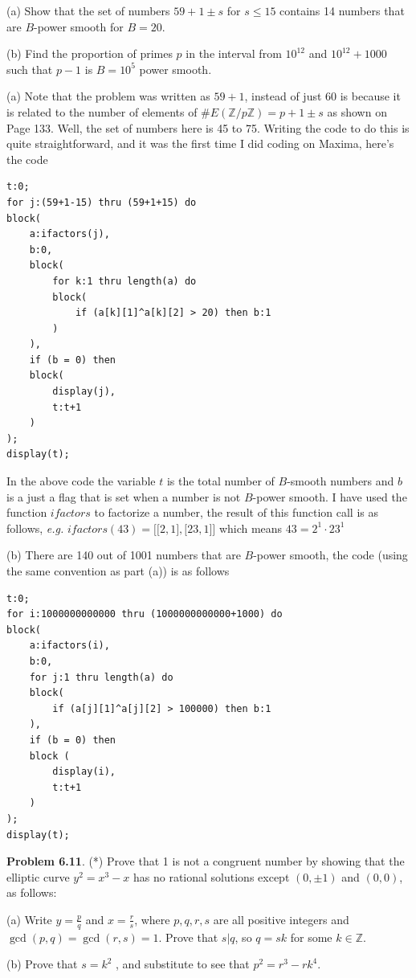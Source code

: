 \documentclass[aps,preprint,preprintnumbers,nofootinbib,showpacs,prd]{revtex4-1}
\newcommand{\eg}{{\it e.g.} }
\begin{document}
(a) Show that the set of numbers $59 + 1 \pm s$ for $s \le 15$ contains 14 numbers that are $B$-power smooth for $B = 20$.

(b) Find the proportion of primes $p$ in the interval from $10^{12}$ and $10^{12} + 1000$ such that $p - 1$ is $B = 10^5$ power smooth.

(a) Note that the problem was written as $59 + 1$, instead of just $60$ is because it is related to the number of elements of $\#E(\mathbb{Z}/p\mathbb{Z}) = p + 1 \pm s$ as shown on Page 133. Well, the set of numbers here is 45 to 75. Writing the code to do this is quite straightforward, and it was the first time I did coding on Maxima, here's the code
%
\begin{verbatim}
t:0;
for j:(59+1-15) thru (59+1+15) do
block(
    a:ifactors(j),
    b:0,
    block(
        for k:1 thru length(a) do
        block(
            if (a[k][1]^a[k][2] > 20) then b:1
        )
    ),
    if (b = 0) then 
    block(
        display(j),
        t:t+1
    )  
);
display(t);
\end{verbatim}
%
In the above code the variable $t$ is the total number of $B$-smooth numbers and $b$ is a just a flag that is set when a number is not $B$-power smooth. I have used the function $ifactors$ to factorize a number, the result of this function call is as follows, \eg $ifactors(43) = \lbrack\lbrack2,1\rbrack,\lbrack23,1\rbrack\rbrack$ which means $43 = 2^1 \cdot 23^1$

(b) There are 140 out of 1001 numbers that are $B$-power smooth, the code (using the same convention as part (a)) is as follows
\begin{verbatim}
t:0;
for i:1000000000000 thru (1000000000000+1000) do
block(
    a:ifactors(i),
    b:0,
    for j:1 thru length(a) do
    block(
        if (a[j][1]^a[j][2] > 100000) then b:1
    ),
    if (b = 0) then 
    block (
        display(i),
        t:t+1
    )
);
display(t);
\end{verbatim}

{\bf Problem 6.11}. (*) Prove that 1 is not a congruent number by showing that the elliptic curve $y^2 = x^3 - x$ has no rational solutions except $(0, \pm1)$ and $(0, 0)$, as follows:

(a) Write $y = \frac{p}{q}$ and $x = \frac{r}{s}$, where $p, q, r, s$ are all positive integers
and $\gcd(p, q) = \gcd(r, s) = 1$. Prove that $s | q$, so $q = sk$ for some $k \in \mathbb{Z}$.

(b) Prove that $s = k^2$ , and substitute to see that $p^2 = r^3 - rk^4$.
\end{document}
